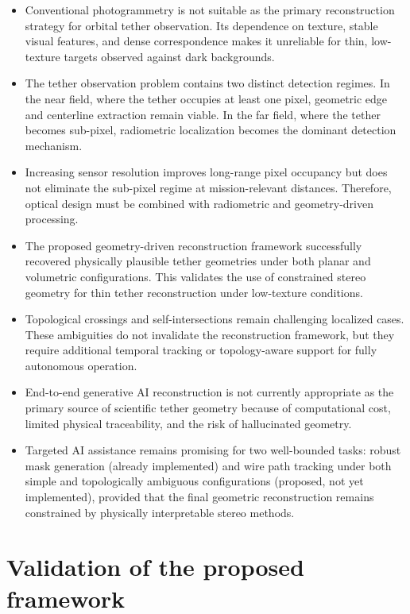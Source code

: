 \begin{itemize}
    \item Conventional photogrammetry is not suitable as the primary reconstruction strategy for orbital tether observation. Its dependence on texture, stable visual features, and dense correspondence makes it unreliable for thin, low-texture targets observed against dark backgrounds.
    \item The tether observation problem contains two distinct detection regimes. In the near field, where the tether occupies at least one pixel, geometric edge and centerline extraction remain viable. In the far field, where the tether becomes sub-pixel, radiometric localization becomes the dominant detection mechanism.
    \item Increasing sensor resolution improves long-range pixel occupancy but does not eliminate the sub-pixel regime at mission-relevant distances. Therefore, optical design must be combined with radiometric and geometry-driven processing.
    \item The proposed geometry-driven reconstruction framework successfully recovered physically plausible tether geometries under both planar and volumetric configurations. This validates the use of constrained stereo geometry for thin tether reconstruction under low-texture conditions.
    \item Topological crossings and self-intersections remain challenging localized cases. These ambiguities do not invalidate the reconstruction framework, but they require additional temporal tracking or topology-aware support for fully autonomous operation.
    \item End-to-end generative AI reconstruction is not currently appropriate as the primary source of scientific tether geometry because of computational cost, limited physical traceability, and the risk of hallucinated geometry.
    \item Targeted AI assistance remains promising for two well-bounded tasks: robust mask generation (already implemented) and wire path tracking under both simple and topologically ambiguous configurations (proposed, not yet implemented), provided that the final geometric reconstruction remains constrained by physically interpretable stereo methods.
\end{itemize}

\section{Validation of the proposed framework}

